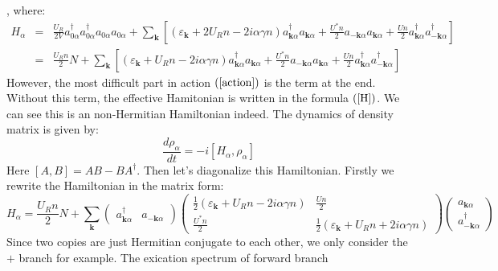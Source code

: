 \documentclass{article}
\newcommand{\tmmathbf}[1]{\ensuremath{\boldsymbol{#1}}}
\begin{document}
, where:
\begin{eqnarray}
  H_{\alpha} & = & \frac{U_R}{2 V} a_{0 \alpha}^{\dagger} a_{0
  \alpha}^{\dagger} a_{0 \alpha} a_{0 \alpha} + \sum_{\tmmathbf{k}} \left[
  (\varepsilon_{\tmmathbf{k}} + 2 U_R n - 2 i \alpha \gamma n) a_{\tmmathbf{k}
  \alpha}^{\dagger} a_{\tmmathbf{k} \alpha} + \frac{U^{\ast} n}{2}
  a_{-\tmmathbf{k} \alpha} a_{\tmmathbf{k} \alpha} + \frac{U n}{2}
  a_{\tmmathbf{k} \alpha}^{\dagger} a_{-\tmmathbf{k} \alpha}^{\dagger} \right]
  \nonumber\\
  & = & \frac{U_R n}{2} N + \sum_{\tmmathbf{k}} \left[
  (\varepsilon_{\tmmathbf{k}} + U_R n - 2 i \alpha \gamma n) a_{\tmmathbf{k}
  \alpha}^{\dagger} a_{\tmmathbf{k} \alpha} + \frac{U^{\ast} n}{2}
  a_{-\tmmathbf{k} \alpha} a_{\tmmathbf{k} \alpha} + \frac{U n}{2}
  a_{\tmmathbf{k} \alpha}^{\dagger} a_{-\tmmathbf{k} \alpha}^{\dagger} \right]
  \label{H} 
\end{eqnarray}
However, the most difficult part in action $\left( \ref{action} \right)$ is
the term at the end. Without this term, the effective Hamitonian is written in
the formula $\left( \ref{H} \right)$. We can see this is an non-Hermitian
Hamiltonian indeed. The dynamics of density matrix is given by:
\begin{equation}
  \frac{d \rho_{\alpha}}{d t} = - i [H_{\alpha}, \rho_{\alpha}]
\end{equation}
Here $[A, B] = A B - B A^{\dagger}$. Then let's diagonalize this Hamiltonian.
Firstly we rewrite the Hamiltonian in the matrix form:
\begin{equation}
  H_{\alpha} = \frac{U_R n}{2} N + \sum_{\tmmathbf{k}} \left(\begin{array}{cc}
    a_{\tmmathbf{k} \alpha}^{\dagger} & a_{-\tmmathbf{k} \alpha}
  \end{array}\right) \left(\begin{array}{cc}
    \frac{1}{2} (\varepsilon_{\tmmathbf{k}} + U_R n - 2 i \alpha \gamma n) &
    \frac{U n}{2}\\
    \frac{U^{\ast} n}{2} & \frac{1}{2} (\varepsilon_{\tmmathbf{k}} + U_R n + 2
    i \alpha \gamma n)
  \end{array}\right) \left(\begin{array}{c}
    a_{\tmmathbf{k} \alpha}\\
    a_{-\tmmathbf{k} \alpha}^{\dagger}
  \end{array}\right)
\end{equation}
Since two copies are just Hermitian conjugate to each other, we only consider
the $+$ branch for example. The exication spectrum of forward branch
\end{document}
